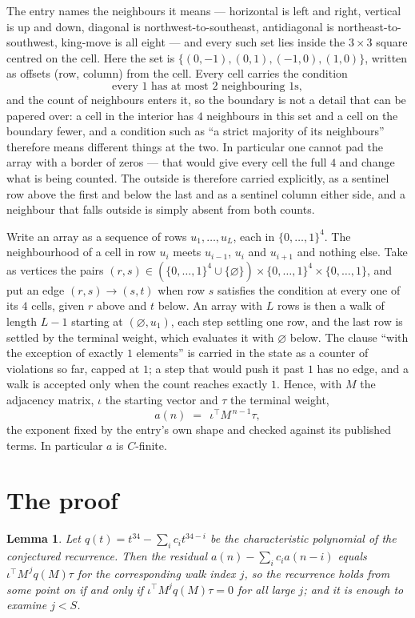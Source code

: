 \documentclass[11pt,a4paper]{article}
\theoremstyle{plain}
\newtheorem{lemma}[theorem]{Lemma}
\theoremstyle{definition}
\begin{document}
The entry names the neighbours it means --- horizontal is left and right, vertical is up and
down, diagonal is northwest-to-southeast, antidiagonal is northeast-to-southwest, king-move is
all eight --- and every such set lies inside the $3\times3$ square centred on the cell. Here
the set is $\{(0,-1), (0,1), (-1,0), (1,0)\}$, written as offsets (row, column) from the cell. Every cell carries
the condition
\[
\text{every 1 has at most 2 neighbouring 1s},
\]
and the count of neighbours enters it, so the boundary is not a detail that can be papered
over: a cell in the interior has $4$ neighbours in this set and a cell on the boundary
fewer, and a condition such as ``a strict majority of its neighbours'' therefore means
different things at the two. In particular one cannot pad the array with a border of zeros ---
that would give every cell the full $4$ and change what is being counted. The outside is
therefore carried
explicitly, as a sentinel row above the first and below the last and as a sentinel column
either side, and a neighbour that falls outside is simply absent from both counts.

Write an array as a sequence of rows $u_1,\dots,u_L$, each in
$\{0,\dots,1\}^{4}$. The neighbourhood of a cell in row $u_i$ meets $u_{i-1}$,
$u_i$ and $u_{i+1}$ and nothing else. Take as vertices the pairs
$(r,s)\in(\{0,\dots,1\}^{4}\cup\{\varnothing\})\times\{0,\dots,1\}^{4} \times \{0,\dots,1\}$,
and put an edge $(r,s)\to(s,t)$ when row $s$ satisfies the condition at every one of its
$4$ cells, given $r$ above and $t$ below. An array with $L$ rows is then a walk of length
$L-1$ starting at $(\varnothing,u_1)$, each step settling one row, and the last row is
settled by the terminal weight, which evaluates it with $\varnothing$ below. The clause ``with the exception of exactly $1$ elements'' is carried in
the state as a counter of violations so far, capped at $1$; a step that would push it past
$1$ has no edge, and a walk is accepted only when the count reaches exactly $1$. Hence,
with $M$ the adjacency matrix, $\iota$ the starting vector and $\tau$ the terminal weight,
\[
a(n)\;=\;\,\iota^{\!\top}M^{\,n-1}\tau ,
\]
the exponent fixed by the entry's own shape and checked against its published terms. In
particular $a$ is $C$-finite.

\section{The proof}

\begin{lemma}\label{lem:crit}
Let $q(t)=t^{34}-\sum_i c_it^{34-i}$ be the characteristic polynomial of the
conjectured recurrence. Then the residual $a(n)-\sum_ic_ia(n-i)$ equals
$\iota^{\!\top}M^{\,j}q(M)\tau$ for the corresponding walk index $j$, so the
recurrence holds from some point on if and only if $\iota^{\!\top}M^{j}q(M)\tau=0$ for all
large $j$; and it is enough to examine $j<S$.
\end{lemma}
\end{document}
